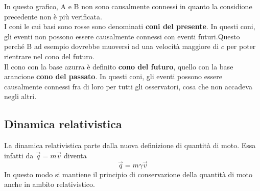 In questo grafico, A e B non sono causalmente connessi in quanto la considione precedente non è
più verificata.\\
I coni le cui basi sono rosse sono denominati \textbf{coni del presente}. In questi coni, gli 
eventi non possono essere causalmente connessi con eventi futuri.Questo perché B ad esempio 
dovrebbe muoversi ad una velocità maggiore di $c$ per poter rientrare nel cono del futuro.\\
Il cono con la base azurra è definito \textbf{cono del futuro}, quello con la base arancione
\textbf{cono del passato}. In questi coni, gli eventi possono essere causalmente connessi fra di 
loro per tutti gli osservatori, cosa che non accadeva negli altri.

\subsection{Dinamica relativistica}
La dinamica relativistica parte dalla nuova definizione di quantità di moto. Essa infatti da
$\vec{q}=m\vec{v}$ diventa
\begin{equation*}
  \vec{q} = m\gamma\vec{v}
\end{equation*}
In questo modo si mantiene il principio di conservazione della quantità di moto anche in ambito
relativistico.
